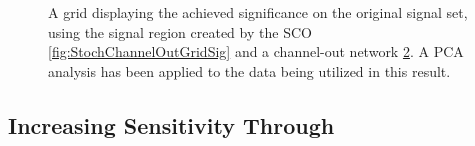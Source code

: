 \begin{figure}
{\begin{subfigure}{.5\textwidth}
        \caption{}
        \label{fig:ChannelOutGridSig}
    \end{subfigure}
    }
    \caption{A grid displaying the achieved significance on the original signal set, using the signal region 
    created by the \ac{SCO} \ref{fig:StochChannelOutGridSig} and a channel-out network \ref{fig:ChannelOutGridSig}. 
    A \ac{PCA} analysis has been applied to the data being utilized in this result.}
\end{figure}

\subsection{Increasing Sensitivity Through}
\begin{figure}
\end{figure}
